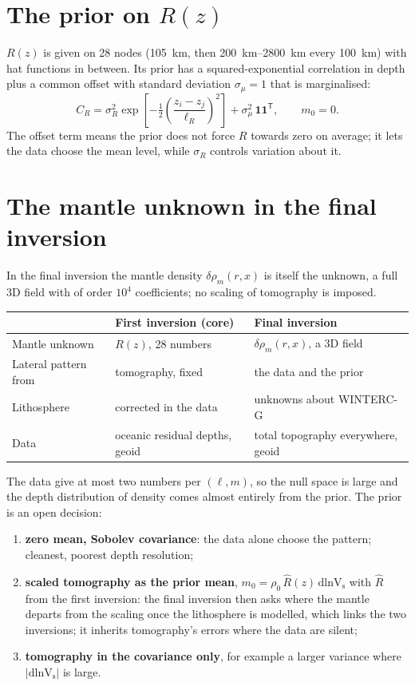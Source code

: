 \section{The prior on $R(z)$}

$R(z)$ is given on 28 nodes (\qty{105}{km}, then \qtyrange{200}{2800}{km} every \qty{100}{km}) with hat functions in between.
Its prior has a squared-exponential correlation in depth plus a common offset with standard deviation $\sigma_\mu = 1$ that is marginalised:
\[
    C_R = \sigma_R^2\exp\!\left[-\tfrac12\left(\frac{z_i-z_j}{\ell_R}\right)^2\right] + \sigma_\mu^2\,\mathbf 1\mathbf 1^{\mathsf T},
    \qquad m_0 = 0.
\]
The offset term means the prior does not force $R$ towards zero on average; it lets the data choose the mean level, while $\sigma_R$ controls variation about it.

\section{The mantle unknown in the final inversion}
In the final inversion the mantle density $\delta\rho_m(r,x)$ is itself the unknown, a full 3D field with of order $10^4$ coefficients; no scaling of tomography is imposed.
\begin{center}
\small
\begin{tabular}{lll}
\toprule
& First inversion (core) & Final inversion\\
\midrule
Mantle unknown & $R(z)$, 28 numbers & $\delta\rho_m(r,x)$, a 3D field\\
Lateral pattern from & tomography, fixed & the data and the prior\\
Lithosphere & corrected in the data & unknowns about WINTERC-G\\
Data & oceanic residual depths, geoid & total topography everywhere, geoid\\
\bottomrule
\end{tabular}
\end{center}
The data give at most two numbers per $(\ell,m)$, so the null space is large and the depth distribution of density comes almost entirely from the prior.
The prior is an open decision:
\begin{enumerate}[nosep]
\item \textbf{zero mean, Sobolev covariance}: the data alone choose the pattern; cleanest, poorest depth resolution;
\item \textbf{scaled tomography as the prior mean}, $m_0 = \rho_0\,\hat R(z)\,\mathrm{dlnV_s}$ with $\hat R$ from the first inversion: the final inversion then asks where the mantle departs from the scaling once the lithosphere is modelled, which links the two inversions; it inherits tomography's errors where the data are silent;
\item \textbf{tomography in the covariance only}, for example a larger variance where $|\mathrm{dlnV_s}|$ is large.
\end{enumerate}

